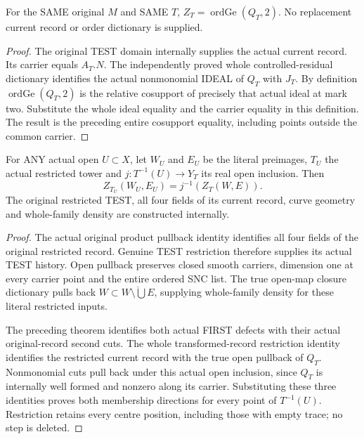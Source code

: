 \begin{theorem}
\label{hir:sharp-original-curve-first-defect-original-second-cut}
\leanok
For the SAME original $M$ and SAME $T$, $Z_T=\operatorname{ordGe}(Q_T,2)$.
No replacement current record or order dictionary is supplied.
\end{theorem}
\begin{proof}
The original TEST domain internally supplies the actual current record.
Its carrier equals $A_T.N$. The independently proved whole
controlled-residual dictionary identifies the actual nonmonomial IDEAL
of $Q_T$ with $J_T$. By definition $\operatorname{ordGe}(Q_T,2)$ is the
relative cosupport of precisely that actual ideal at mark two.
Substitute the whole ideal equality and the carrier equality in this
definition. The result is the preceding entire cosupport equality,
including points outside the common carrier.
\end{proof}

\begin{theorem}
\label{hir:sharp-original-curve-first-defect-open-restriction}
\leanok
For ANY actual open $U\subset X$, let $W_U$ and $E_U$ be the literal
preimages, $T_U$ the actual restricted tower and
$j:T^{-1}(U)\longrightarrow Y_T$ its real open inclusion. Then
\[
 Z_{T_U}(W_U,E_U)=j^{-1}(Z_T(W,E)).
\]
The original restricted TEST, all four fields of its current record,
curve geometry and whole-family density are constructed internally.
\end{theorem}
\begin{proof}
The actual original product pullback identity identifies all four fields
of the original restricted record. Genuine TEST restriction therefore
supplies its actual TEST history. Open pullback preserves closed smooth
carriers, dimension one at every carrier point and the entire ordered
SNC list. The true open-map closure dictionary pulls back
$W\subset\overline{W\setminus\bigcup E}$, supplying whole-family density
for these literal restricted inputs.

The preceding theorem identifies both actual FIRST defects with their
actual original-record second cuts. The whole transformed-record
restriction identity identifies the restricted current record with the
true open pullback of $Q_T$. Nonmonomial cuts pull back under this actual
open inclusion, since $Q_T$ is internally well formed and nonzero along
its carrier. Substituting these three identities proves both membership
directions for every point of $T^{-1}(U)$. Restriction retains every
centre position, including those with empty trace; no step is deleted.
\end{proof}

